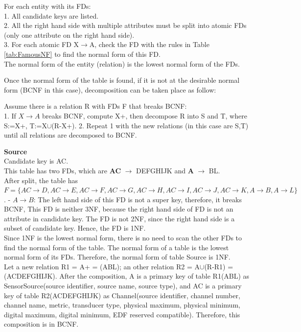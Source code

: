 \begin{adjustwidth}{1cm}{}
For each entity with its FDs:\\
1. All candidate keys are listed.\\
2. All the right hand side with multiple attributes must be split into atomic FDs (only one attribute on the right hand side).\\
3. For each atomic FD X$\rightarrow$A, check the FD with the rules in Table \ref{tab:FamousNF} to find the normal form of this FD.\\
The normal form of the entity (relation) is the lowest normal form of the FDs.
\end{adjustwidth}
Once the normal form of the table is found, if it is not at the desirable normal form (BCNF in this case), decomposition can be taken place as follow\cite{INF3100_Recipe_book}:
\begin{adjustwidth}{1cm}{}
Assume there is a relation R with FDs F that breaks BCNF:\\
1. If $X \rightarrow A$ breaks BCNF, compute X+, then decompose R into S and T, where S:=X+, T:=X$\cup$(R-X+).
2. Repeat 1 with the new relations (in this case are S,T) until all relations are decomposed to BCNF.
\end{adjustwidth}
\textbf{Source}\\
Candidate key is AC.\\
This table has two FDs, which are \textbf{AC} $\rightarrow$ DEFGHIJK and \textbf{A} $\rightarrow$ BL.\\
After split, the table has $F=\{AC \rightarrow D, AC \rightarrow E, AC \rightarrow F, AC \rightarrow G, AC \rightarrow H, AC \rightarrow I, AC \rightarrow J, AC \rightarrow K, A \rightarrow B, A \rightarrow L\}$.
- $A \rightarrow B$: The left hand side of this FD is not a super key, therefore, it breaks BCNF, This FD is neither 3NF, because the right hand side of FD is not an attribute in candidate key. The FD is not 2NF, since the right hand side is a subset of candidate key. Hence, the FD is 1NF.\\
Since 1NF is the lowest normal form, there is no need to scan the other FDs to find the normal form of the table. The normal form of a table is the lowest normal form of its FDs. Therefore, the normal form of table Source is 1NF.\\
Let a new relation R1 = A+ = (ABL); an other relation R2 = A$\cup$(R-R1) = (ACDEFGHIJK). After the composition, A is a primary key of table R1(ABL) as SensorSource(source identifier, source name, source type), and AC is a primary key of table R2(ACDEFGHIJK) as Channel(source identifier, channel number, channel name, metric, transducer type, physical maximum, physical minimum, digital maximum, digital minimum, EDF reserved compatible). Therefore, this composition is in BCNF.\\

